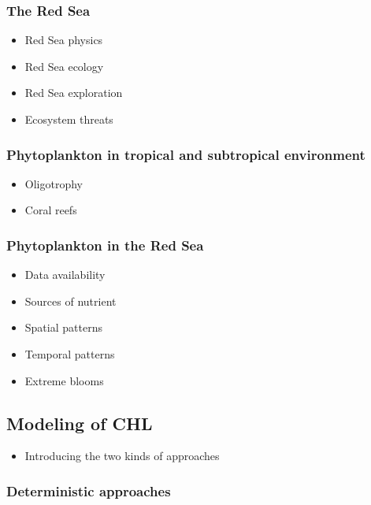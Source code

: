 		\subsubsection{The Red Sea}

			\begin{itemize}
				\item Red Sea physics
				\item Red Sea ecology
				\item Red Sea exploration
				\item Ecosystem threats
			\end{itemize}

		\subsubsection{Phytoplankton in tropical and subtropical environment}

			\begin{itemize}
				\item Oligotrophy
				\item Coral reefs
			\end{itemize}

		\subsubsection{Phytoplankton in the Red Sea}

			\begin{itemize}
				\item Data availability
				\item Sources of nutrient
				\item Spatial patterns
				\item Temporal patterns
				\item Extreme blooms
			\end{itemize}

	\subsection{Modeling of CHL}

		\begin{itemize}
			\item Introducing the two kinds of approaches
		\end{itemize}

		\subsubsection{Deterministic approaches}

